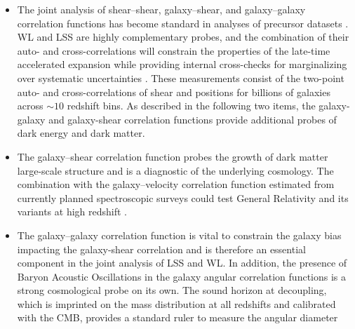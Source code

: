 \begin{itemize}
\item The
joint analysis of shear--shear, galaxy--shear, and galaxy--galaxy
correlation functions has become standard in analyses of precursor datasets
\cite[e.g.][]{2017arXiv170801530D,2018MNRAS.474.4894J}. WL and LSS are highly complementary probes, and the combination
of their auto- and cross-correlations will constrain the properties of the late-time accelerated expansion while providing
internal cross-checks for marginalizing over systematic uncertainties \cite[e.g.,][]{2018ARA&A..56..393M}.
These measurements consist of the two-point auto- and cross-correlations of shear and positions for billions of galaxies across $\sim 10$ redshift bins.
As described in the following two items, the galaxy-galaxy and galaxy-shear correlation functions provide additional probes of dark energy and dark matter.
%
%
\item The galaxy--shear correlation function probes the growth of dark matter large-scale structure and is a
diagnostic of the underlying cosmology. The combination with the
galaxy--velocity correlation function estimated from currently planned
spectroscopic surveys
could test General Relativity and its variants at high redshift \citep{2010Natur.464..256R}.
%
\item The galaxy--galaxy correlation function is vital to constrain the galaxy bias impacting the galaxy-shear correlation and is therefore
an essential component in the joint analysis of LSS and WL. In addition, the presence of
Baryon Acoustic Oscillations in the galaxy angular correlation functions is a strong cosmological
probe on its own. The sound horizon at decoupling, which is imprinted on the
mass distribution at all redshifts and calibrated with the CMB, provides a standard ruler to measure the angular diameter

\end{itemize}
